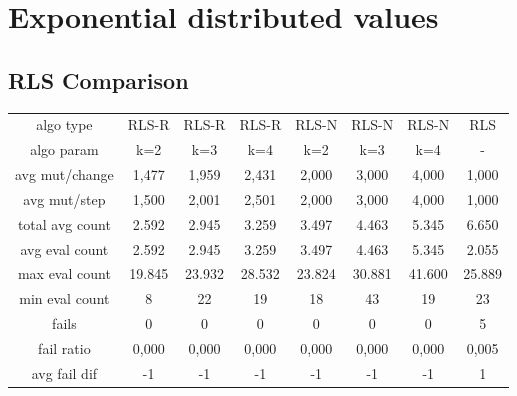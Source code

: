 \section{Exponential distributed values}
\subsection{RLS Comparison}
\begin{tabular}[h]{cccccccc}
algo type&         RLS-R&  RLS-R&  RLS-R&  RLS-N&  RLS-N&  RLS-N&    RLS\\
algo param&          k=2&    k=3&    k=4&    k=2&    k=3&    k=4&      -\\
avg mut/change&    1,477&  1,959&  2,431&  2,000&  3,000&  4,000&  1,000\\
avg mut/step&      1,500&  2,001&  2,501&  2,000&  3,000&  4,000&  1,000\\
\hline
total avg count&   2.592&  2.945&  3.259&  3.497&  4.463&  5.345&  6.650\\
avg eval count&    2.592&  2.945&  3.259&  3.497&  4.463&  5.345&  2.055\\
max eval count&   19.845& 23.932& 28.532& 23.824& 30.881& 41.600& 25.889\\
min eval count&        8&     22&     19&     18&     43&     19&     23\\
\hline
fails&                 0&      0&      0&      0&      0&      0&      5\\
fail ratio&        0,000&  0,000&  0,000&  0,000&  0,000&  0,000&  0,005\\
avg fail dif&         -1&     -1&     -1&     -1&     -1&     -1&      1\\
\end{tabular}
